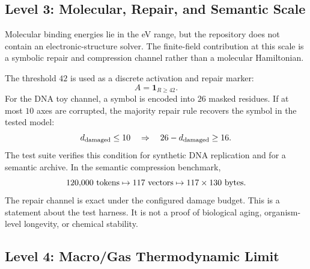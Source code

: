 \documentclass[11pt]{article}
\begin{document}
\subsection{Level 3: Molecular, Repair, and Semantic Scale}

Molecular binding energies lie in the eV range, but the repository does not
contain an electronic-structure solver.  The finite-field contribution at this
scale is a symbolic repair and compression channel rather than a molecular
Hamiltonian.

The threshold $42$ is used as a discrete activation and repair marker:
\begin{equation}
    A=\mathbf{1}_{R\ge42}.
\end{equation}
For the DNA toy channel, a symbol is encoded into $26$ masked residues.  If at
most $10$ axes are corrupted, the majority repair rule recovers the symbol in
the tested model:
\begin{equation}
    d_{\rm damaged}\le10
    \quad\Rightarrow\quad
    26-d_{\rm damaged}\ge16.
\end{equation}
The test suite verifies this condition for synthetic DNA replication and for a
semantic archive.  In the semantic compression benchmark,
\begin{equation}
    120{,}000~{\rm tokens}
    \mapsto
    117~{\rm vectors}
    \mapsto
    117\times130~{\rm bytes}.
\end{equation}
The repair channel is exact under the configured damage budget.  This is a
statement about the test harness.  It is not a proof of biological aging,
organism-level longevity, or chemical stability.

\subsection{Level 4: Macro/Gas Thermodynamic Limit}
\end{document}
